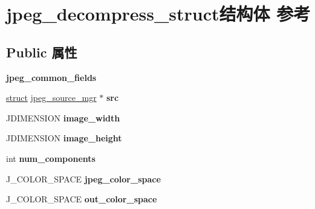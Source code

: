 \hypertarget{structjpeg__decompress__struct}{}\section{jpeg\+\_\+decompress\+\_\+struct结构体 参考}
\label{structjpeg__decompress__struct}
\subsection*{Public 属性}
\begin{DoxyCompactItemize}
\item 
\mbox{\label{structjpeg__decompress__struct_a62d872add9f188d06908d327da2a24fd}} 
{\bfseries jpeg\+\_\+common\+\_\+fields}
\item 
\mbox{\label{structjpeg__decompress__struct_aa0f9a673100231cfd81f17b789784785}} 
\hyperlink{interfacestruct}{struct} \hyperlink{structjpeg__source__mgr}{jpeg\+\_\+source\+\_\+mgr} $\ast$ {\bfseries src}
\item 
\mbox{\label{structjpeg__decompress__struct_a433c0a54f42dfd3d2977ea967b9a21ee}} 
J\+D\+I\+M\+E\+N\+S\+I\+ON {\bfseries image\+\_\+width}
\item 
\mbox{\label{structjpeg__decompress__struct_ad711fae8063a3e75e3c0cccd8512bedf}} 
J\+D\+I\+M\+E\+N\+S\+I\+ON {\bfseries image\+\_\+height}
\item 
\mbox{\label{structjpeg__decompress__struct_a15d5e8c34e5c66983eda5c0070f0be95}} 
int {\bfseries num\+\_\+components}
\item 
\mbox{\label{structjpeg__decompress__struct_a980b92cd751cbc72cc7edd1f9ef2c3e4}} 
J\+\_\+\+C\+O\+L\+O\+R\+\_\+\+S\+P\+A\+CE {\bfseries jpeg\+\_\+color\+\_\+space}
\item 
\mbox{\label{structjpeg__decompress__struct_a4e69e870df7b81671043374d01efc14f}} 
J\+\_\+\+C\+O\+L\+O\+R\+\_\+\+S\+P\+A\+CE {\bfseries out\+\_\+color\+\_\+space}
\item 
\mbox{\label{structjpeg__decompress__struct_a6c87b02686e69267d26e28c5d3775469}} 

\end{DoxyCompactItemize}
